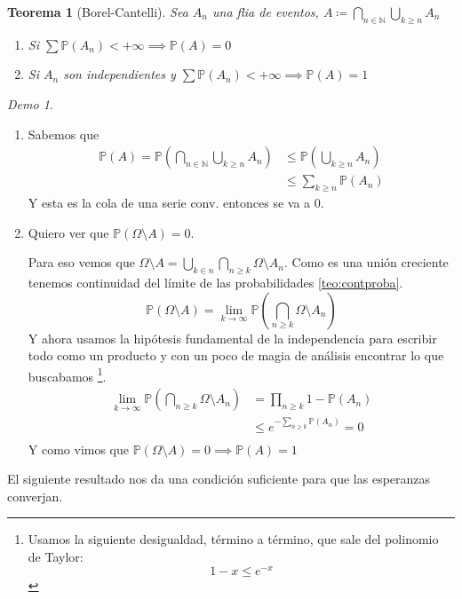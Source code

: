 \documentclass[11pt]{article}
\theoremstyle{plain} %
\newtheorem{teorema}{Teorema}
\theoremstyle{definition}
\theoremstyle{remark}
\newtheorem*{demo}{Demo}
\def\Om{\Omega}
\def\N{\mathbb{N}}
\def\P{\mathbb{P}}
\renewcommand\qed{\ding{110}}
\begin{document}
\begin{teorema}
	[Borel-Cantelli]
	Sea $A_n$ una flia de eventos, $A \coloneqq \bigcap_{n \in \N} \bigcup_{k \geq n} A_n$
	\begin{enumerate}
		\item Si $\sum \P (A_n) < + \infty \implies \P(A)=0$ 
		\item Si $A_n$ son independientes y $\sum \P (A_n) < + \infty \implies \P(A)=1$ 
	\end{enumerate}	
\end{teorema}

\begin{demo}
	\begin{enumerate}
		Ambas demostraciones son directas salvo la segunda que requiere un poco de ingenio al final.
		\item Sabemos que 
		\begin{align*}
			\P (A) = \P (\bigcap_{n \in \N} \bigcup_{k \geq n} A_n) &\leq \P(\bigcup_{k \geq n} A_n) \\
			&\leq \sum_{k \geq n} \P(A_n)
		\end{align*}
Y esta es la cola de una serie conv. entonces se va a 0.

		\item Quiero ver que $\P(\Om \setminus A) = 0$.
		
		Para eso vemos que $\Om \setminus A =  \bigcup_{k \in n} \bigcap_{n \geq k} \Om \setminus A_n$. Como es una unión creciente tenemos continuidad del límite de las probabilidades \ref{teo:contproba}.
		\[ \P\left( \Om \setminus A \right)  = \lim_{k \to \infty} \P (\bigcap_{n \geq k} \Om \setminus A_n)  \]
		Y ahora usamos la hipótesis fundamental de la independencia para escribir todo como un producto y con un poco de magia de análisis encontrar lo que buscabamos \footnote{Usamos la siguiente desigualdad, término a término, que sale del polinomio de Taylor: $$1-x \leq e^{-x}$$}.
		\begin{align*}
			\lim_{k \to \infty} \P (\bigcap_{n \geq k} \Om \setminus A_n) &=\prod_{n \geq k} 1 - \P(A_n) \\
			& \leq e^{-\sum_{n \geq k} \P(A_n)}  = 0 \\
		\end{align*}
		Y como vimos que $\P(\Om \setminus A) = 0 \implies \P(A)=1$ \qed
	\end{enumerate}
\end{demo}

El siguiente resultado nos da una  condición suficiente para que las esperanzas converjan.
\end{document}
